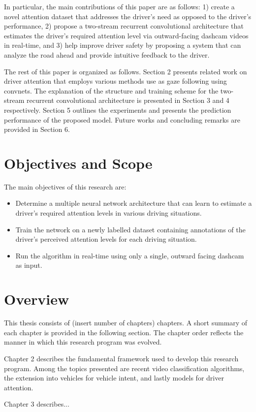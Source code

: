 In particular, the main contributions of this paper are as follows: 1) create a novel attention dataset that addresses the driver's need as opposed to the driver's performance, 2) propose a two-stream recurrent convolutional architecture that estimates the driver's required attention level via outward-facing dashcam videos in real-time, and 3) help improve driver safety by proposing a system that can analyze the road ahead and provide intuitive feedback to the driver.

The rest of this paper is organized as follows. Section 2 presents related work on driver attention that employs various methods use as gaze following using convnets. The explanation of the structure and training scheme for the two-stream recurrent convolutional architecture is presented in Section 3 and 4 respectively. Section 5 outlines the experiments and presents the prediction performance of the proposed model. Future works and concluding remarks are provided in Section 6.


\section{Objectives and Scope}
The main objectives of this research are:
\begin{itemize}
  \item Determine a multiple neural network architecture that can learn to estimate a driver's required attention levels in various driving situations.
  \item Train the network on a newly labelled dataset containing annotations of the driver's perceived attention levels for each driving situation.
  \item Run the algorithm in real-time using only a single, outward facing dashcam as input.
\end{itemize}

\section{Overview}
This thesis consists of (insert number of chapters) chapters. A short summary of each chapter is provided in the following section. The chapter order reflects the manner in which this research program was evolved.

Chapter 2 describes the fundamental framework used to develop this research program. Among the topics presented are recent video classification algorithms, the extension into vehicles for vehicle intent, and lastly models for driver attention.

Chapter 3 describes...

